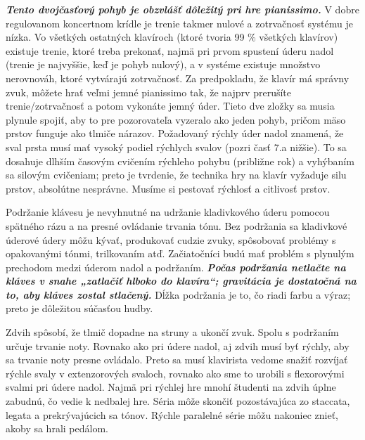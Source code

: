 \documentclass[11pt,a4paper%
]{book}
\begin{document}
\emph{\textbf{Tento dvojčasťový pohyb je obzvlášť dôležitý pri hre pianissimo.}} V dobre regulovanom koncertnom krídle je trenie takmer nulové a zotrvačnosť systému je nízka. Vo všetkých ostatných klavíroch (ktoré tvoria 99 \% všetkých klavírov) existuje trenie, ktoré treba prekonať, najmä pri prvom spustení úderu nadol (trenie je najvyššie, keď je pohyb nulový), a v systéme existuje množstvo nerovnováh, ktoré vytvárajú zotrvačnosť. Za predpokladu, že klavír má správny zvuk, môžete hrať veľmi jemné pianissimo tak, že najprv prerušíte trenie/zotrvačnosť a potom vykonáte jemný úder. Tieto dve zložky sa musia plynule spojiť, aby to pre pozorovateľa vyzeralo ako jeden pohyb, pričom mäso prstov funguje ako tlmiče nárazov. Požadovaný rýchly úder nadol znamená, že sval prsta musí mať vysoký podiel rýchlych svalov (pozri časť 7.a nižšie). To sa dosahuje dlhším časovým cvičením rýchleho pohybu (približne rok) a vyhýbaním sa silovým cvičeniam; preto je tvrdenie, že technika hry na klavír vyžaduje silu prstov, absolútne nesprávne. Musíme si pestovať rýchlosť a citlivosť prstov.

Podržanie klávesu je nevyhnutné na udržanie kladivkového úderu pomocou spätného rázu a na presné ovládanie trvania tónu. Bez podržania sa kladivkové úderové údery môžu kývať, produkovať cudzie zvuky, spôsobovať problémy s opakovanými tónmi, trilkovaním atď. Začiatočníci budú mať problém s plynulým prechodom medzi úderom nadol a podržaním. \emph{\textbf{Počas podržania netlačte na kláves v snahe „zatlačiť hlboko do klavíra``; gravitácia je dostatočná na to, aby kláves zostal stlačený.}} Dĺžka podržania je to, čo riadi farbu a výraz; preto je dôležitou súčasťou hudby.

Zdvih spôsobí, že tlmič dopadne na struny a ukončí zvuk. Spolu s podržaním určuje trvanie noty. Rovnako ako pri údere nadol, aj zdvih musí byť rýchly, aby sa trvanie noty presne ovládalo. Preto sa musí klavirista vedome snažiť rozvíjať rýchle svaly v extenzorových svaloch, rovnako ako sme to urobili s flexorovými svalmi pri údere nadol. Najmä pri rýchlej hre mnohí študenti na zdvih úplne zabudnú, čo vedie k nedbalej hre. Séria môže skončiť pozostávajúca zo staccata, legata a prekrývajúcich sa tónov. Rýchle paralelné série môžu nakoniec znieť, akoby sa hrali pedálom.
\end{document}
